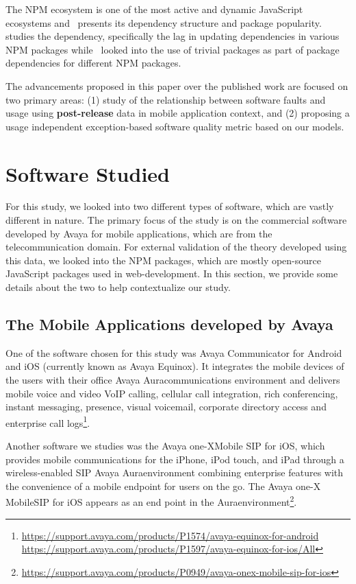 \documentclass[smallextended]{svjour3}       %
\begin{document}
The NPM ecosystem is one of the most active and dynamic JavaScript ecosystems and~\cite{wittern2016look} presents its dependency structure and package popularity.~\cite{zerouali2018empirical} studies the dependency, specifically the lag in updating dependencies in various NPM packages while~\cite{abdalkareem2017developers} looked into the use of trivial packages as part of package dependencies for different NPM packages. 


The advancements proposed in this paper over the published work are focused 
on two primary areas: (1) study of the relationship between software faults and usage 
using \textbf{post-release} data in mobile application context, and (2) proposing a usage independent exception-based software quality metric based on our models.



\section{Software Studied}\label{s:soft}

For this study, we looked into two different types of software, which are vastly different in nature. The primary focus of the study is on the commercial software developed by Avaya for mobile applications, which are from the telecommunication domain. For external validation of the theory developed using this data, we looked into the NPM packages, which are mostly open-source JavaScript packages used in web-development. In this section, we provide some details about the two to help contextualize our study.

\subsection{The Mobile Applications developed by Avaya}
One of the software chosen for this study was Avaya Communicator for
Android and iOS (currently known as Avaya Equinox\textregistered ). It
integrates the mobile devices of the users with their office Avaya
Aura\textregistered communications environment and delivers mobile
voice and video VoIP calling, cellular call integration, rich
conferencing, instant messaging, presence, visual voicemail,
corporate directory access and enterprise call logs\footnote{\url{https://support.avaya.com/products/P1574/avaya-equinox-for-android}\\   \url{https://support.avaya.com/products/P1597/avaya-equinox-for-ios/All}}.

Another software we studies was the Avaya one-X\textregistered Mobile  SIP  for  iOS, which provides mobile communications for the iPhone, iPod touch, and iPad through a wireless-enabled SIP Avaya Aura\textregistered environment combining enterprise features with the convenience of a mobile endpoint for users on the go. The Avaya one-X Mobile\textregistered SIP for iOS appears as an end point in the Aura\textregistered environment\footnote{\url{https://support.avaya.com/products/P0949/avaya-onex-mobile-sip-for-ios}}.
\end{document}
